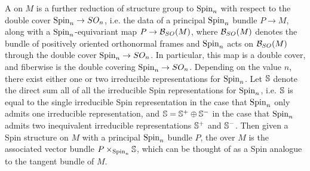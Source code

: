 A  on $M$ is a further reduction of structure group to
$\Spin_n$ with respect to the double cover $\Spin_n \to SO_n$, i.e. the data of
a principal $\Spin_n$ bundle $P \to M$, along with a $\Spin_n$-equivariant map
$P \to \B_{SO}(M)$, where $\B_{SO}(M)$ denotes the bundle of positively oriented
orthonormal frames
and $\Spin_n$ acts on $\B_{SO}(M)$ through the double cover $\Spin_n \to SO_n$. In
particular, this map is a double cover, and fiberwise is the double covering
$\Spin_n \to SO_n$.
Depending on the value $n$, there exist either one or two irreducible representations
for $\Spin_n$. Let $\S$ denote the direct sum all of all the irreducible
Spin representations
for $\Spin_n$, i.e. $\S$ is equal to the single irreducible Spin representation in the
case that $\Spin_n$ only admits one irreducible representation, and
$\S = \S^+ \oplus \S^-$
in the case that $\Spin_n$ admits two inequivalent irreducible representations $\S^+$
and $\S^-$. Then given a Spin structure on $M$ with a principal $\Spin_n$ bundle
$P$, the  over $M$ is the associated vector bundle
$P \times_{\Spin_n} \S$, which can be thought of as a Spin analogue to
the tangent bundle of $M$.
\raggedbottom
%
